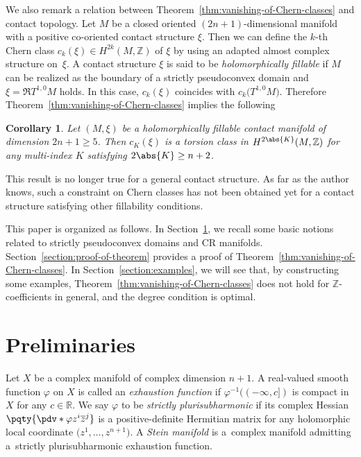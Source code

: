 \documentclass[pdftex]{sigma}
\newcommand{\opcl}[2]{(#1, #2]}
\numberwithin{equation}{section}
\newtheorem{Corollary}[Theorem]{Corollary}
\begin{document}
We also remark a relation between Theorem~\ref{thm:vanishing-of-Chern-classes} and contact topology. Let $M$ be a closed oriented $(2 n + 1)$-dimensional manifold with a positive co-oriented contact structure $\xi$. Then we can define the $k$-th Chern class $c_{k}(\xi) \in H^{2 k}(M, \mathbb{Z})$ of $\xi$ by using an adapted almost complex structure on~$\xi$. A contact structure $\xi$ is said to be \emph{holomorphically fillable} if $M$ can be realized as the boundary of a strictly pseudoconvex domain and $\xi = \Re T^{1, 0} M$ holds. In this case, $c_{k}(\xi)$ coincides with $c_{k}\big(T^{1,0}M\big)$. Therefore Theorem~\ref{thm:vanishing-of-Chern-classes} implies the following

\begin{Corollary}Let $(M, \xi)$ be a holomorphically fillable contact manifold of dimension $2 n + 1 \geq 5$. Then $c_{K}(\xi)$ is a torsion class in $H^{2 \abs{K}}(M, \mathbb{Z})$ for any multi-index $K$ satisfying $2 \abs{K} \geq n + 2$.
\end{Corollary}

This result is no longer true for a general contact structure. As far as the author knows, such a constraint on Chern classes has not been obtained yet for a contact structure
satisfying other fillability conditions.

This paper is organized as follows. In Section~\ref{section:preliminaries}, we recall some basic notions related to strictly pseudoconvex domains and CR manifolds.
Section~\ref{section:proof-of-theorem} provides a proof of Theorem~\ref{thm:vanishing-of-Chern-classes}. In Section~\ref{section:examples}, we will see that, by constructing some examples, Theorem~\ref{thm:vanishing-of-Chern-classes} does not hold for $\mathbb{Z}$-coefficients in general, and the degree condition is optimal.

\section{Preliminaries} \label{section:preliminaries}

Let $X$ be a complex manifold of complex dimension $n + 1$. A real-valued smooth function $\varphi$ on $X$ is called an \emph{exhaustion function} if $\varphi^{- 1}(\opcl{- \infty}{c})$ is compact in $X$ for any $c \in \mathbb{R}$. We say $\varphi$ to be \emph{strictly plurisubharmonic} if its complex Hessian $\pqty{\pdv*{\varphi}{z^{i}}{\overline{z}^{j}}}$ is a positive-definite Hermitian matrix for any holomorphic local coordinate $\big(z^{1}, \dots , z^{n + 1}\big)$. A \emph{Stein manifold} is a~complex manifold admitting a~strictly plurisubharmonic exhaustion function.
\end{document}
